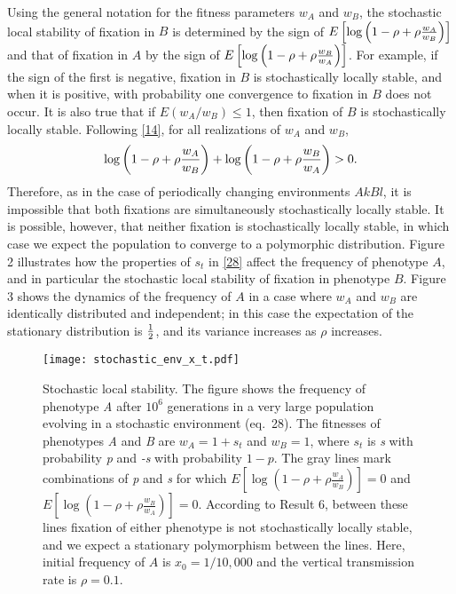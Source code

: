 \documentclass[9pt,twocolumn,twoside,lineno]{pnas-new}
\begin{document}
 
 Using the general notation for the fitness parameters $w_A$ and $w_B$, the stochastic local stability of fixation in $B$ is determined by the sign of $E\left[\log\left(1-\rho+\rho{w_A\over w_B}\right)\right]$ and that of fixation in $A$  by the sign of $E\left[\log\left(1-\rho+\rho{w_B\over w_A}\right)\right]$. For example, if the  sign of the first  is negative, fixation in $B$ is stochastically locally stable, and when it is positive, with probability one convergence to fixation in  $B$ does not occur. It is also true  that if $E(w_A/w_B)\le 1$, then fixation of $B$ is stochastically locally stable. Following \eqref{14}, for all realizations of $w_A$ and $w_B$,
 \begin{equation}
 \log\left(1-\rho +\rho{w_A\over w_B}\right) +\log\left(1-\rho +\rho{w_B\over w_A}\right)>0.\label{30}\end{equation}
 Therefore, as in the case of periodically changing environments $AkBl$, it is impossible that both fixations are simultaneously stochastically locally stable.  It is possible, however, that neither fixation is  stochastically locally stable, in which case we expect the population to converge to a polymorphic distribution. Figure 2 illustrates how the properties of $s_t$ in \eqref{28} affect the frequency of phenotype $A$, and in particular the stochastic local stability of fixation in phenotype $B$. Figure 3 shows the dynamics of the frequency of $A$ in a case where $w_A$ and $w_B$ are identically distributed and independent; in this case the expectation of the stationary distribution is ${1\over 2}$, and its variance increases as $\rho$ increases.

\begin{figure}[h]
\centering
\texttt{[image: stochastic\_env\_x\_t.pdf]}
\caption{Stochastic local stability. 
The figure shows the frequency of phenotype \emph{A} after \(10^6\) generations in a very large population evolving in a stochastic environment (eq.\ 28).
The fitnesses of phenotypes \emph{A} and \emph{B} are \(w_A=1+s_t\) and \(w_B=1\),
where \(s_t\) is \emph{s} with probability \emph{p} and \emph{-s} with probability \(1-p\).
The gray lines mark combinations of \emph{p} and \emph{s} for which \(E[\log{(1-\rho+\rho\frac{w_A}{w_B})}]=0\) and \(E[\log{(1-\rho+\rho\frac{w_B}{w_A})}]=0\).
According to Result 6, between these lines fixation of either phenotype is not stochastically locally stable, and we expect a stationary polymorphism between the lines.
Here, initial frequency of \(A\) is \(x_0=1/10,000\) and the vertical transmission rate is \(\rho=0.1\).}\label{fig:stochastic_env_x_t}
\end{figure} 
\end{document}
